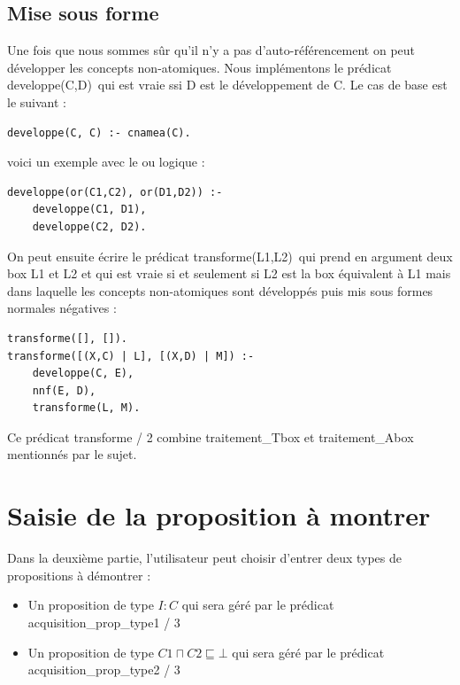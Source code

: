 \documentclass{article}
\begin{document}
\subsection{Mise sous forme}
Une fois que nous sommes sûr qu'il n'y a pas d'auto-référencement on peut développer les concepts non-atomiques. Nous implémentons le prédicat \color{blue}developpe(C,D)\color{black}\ qui est vraie ssi D est le développement de C. Le cas de base est le suivant : 
\begin{verbatim}
developpe(C, C) :- cnamea(C).
\end{verbatim}
voici un exemple avec le ou logique :
\begin{verbatim}
developpe(or(C1,C2), or(D1,D2)) :- 
	developpe(C1, D1), 
	developpe(C2, D2).
 \end{verbatim}
On peut ensuite écrire le prédicat \color{blue}transforme(L1,L2)\color{black}\ qui prend en argument deux box L1 et L2 et qui est vraie si et seulement si L2 est la box équivalent à L1 mais dans laquelle les concepts non-atomiques sont développés puis mis sous formes normales négatives :
\begin{verbatim}
transforme([], []).
transforme([(X,C) | L], [(X,D) | M]) :- 
	developpe(C, E),
	nnf(E, D),
	transforme(L, M).
\end{verbatim}
Ce prédicat \color{blue} transforme / 2 \color{black} combine \color{blue} traitement\_Tbox \color{black} et \color{blue} traitement\_Abox \color{black} mentionnés par le sujet.

\section{Saisie de la proposition à montrer}
Dans la deuxième partie, l'utilisateur peut choisir d'entrer deux types de propositions à démontrer : 
\begin{itemize}
    \item Un proposition de type $ I : C $ qui sera géré par le prédicat \color{blue}acquisition\_prop\_type1 / 3 \color{black}
    \item Un proposition de type $ C1 \sqcap C2 \sqsubseteq \bot  $ qui sera géré par le prédicat \color{blue}acquisition\_prop\_type2 / 3 \color{black}
\end{itemize}
\end{document}
